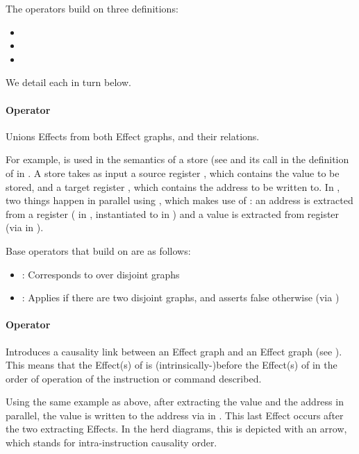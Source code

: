 The operators build on three definitions:
\begin{itemize}
\item {}
\item {}
\item {}
\end{itemize}

We detail each in turn below.

\paragraph{Operator } Unions Effects from both Effect graphs, and their relations.

For example,  is used in the semantics of a store (see
 and its call in the definition of  in
. A store takes as input a source register
, which contains the value  to be stored, and a target
register , which contains the address  to be written to.
In , two things happen in parallel using \source{>>|}, which
makes use of : an address  is extracted from a
register  ( in , instantiated to
 in ) and a value  is extracted from
register  (via  in ).

Base operators that build on  are as follows:
\begin{itemize}
\item \source{=|=}: Corresponds to  over disjoint graphs
\item \source{+|+}: Applies  if there are two disjoint
graphs, and asserts false otherwise (via )
\end{itemize}

\paragraph{Operator } Introduces a causality link between an
Effect graph  and an Effect graph  (see
). This means that the Effect(s) of 
is (intrinsically-)before the Effect(s) of  in the order of
operation of the instruction or command described.

Using the same  example as above, after extracting the value
 and the address  in parallel, the value  is
written to the address  via  in .
This last Effect  occurs after the two extracting Effects.
In the herd diagrams, this is depicted with an  arrow, which
stands for intra-instruction causality order. 

